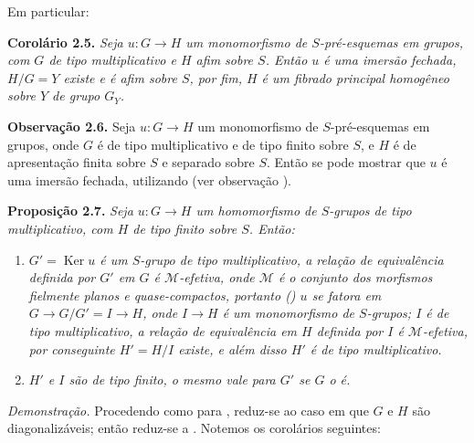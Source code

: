 Em particular:

\medskip
\noindent{}\textbf{Corolário 2.5.}
\textit{Seja \(u:G\to H\) um monomorfismo de \(S\)-pré-esquemas em grupos,
com \(G\) de tipo multiplicativo e \(H\) afim sobre \(S\). Então
\(u\) é uma imersão fechada, \(H/G=Y\) existe e é afim sobre \(S\),
por fim, \(H\) é um fibrado principal homogêneo sobre \(Y\) de
 grupo \(G_Y\).}

\medskip
\noindent{}\textbf{Observação 2.6.}
Seja \(u:G\to H\) um monomorfismo de \(S\)-pré-esquemas em grupos, onde
\(G\) é de tipo multiplicativo e de tipo finito sobre \(S\), e \(H\) é
de apresentação finita sobre \(S\) e separado sobre \(S\).
Então se pode mostrar que \(u\) é uma imersão fechada, utilizando
 (ver observação
).

\medskip
\noindent{}\textbf{Proposição 2.7.}
\textit{Seja \(u:G\to H\) um homomorfismo de \(S\)-grupos de tipo
multiplicativo, com \(H\) de tipo finito sobre \(S\). Então:}
\begin{enumerate}
  \item[(i)]
  \textit{\(G'=\operatorname{Ker}u\) é um \(S\)-grupo de tipo
  multiplicativo, a relação de equivalência definida por \(G'\) em
  \(G\) é \(\mathcal M\)-efetiva, onde \(\mathcal M\) é o
  conjunto dos morfismos fielmente planos e quase-compactos, portanto
  () \(u\) se fatora em
  \(G\to G/G'=I\to H\), onde \(I\to H\) é um monomorfismo de
  \(S\)-grupos; \(I\) é de tipo multiplicativo, a relação de
  equivalência em \(H\) definida por \(I\) é \(\mathcal M\)-efetiva,
  por conseguinte \(H'=H/I\) existe, e além disso \(H'\) é de tipo
  multiplicativo.}

  \item[(ii)]
  \textit{\(H'\) e \(I\) são de tipo finito, o mesmo vale para
  \(G'\) se \(G\) o é.}
\end{enumerate}

\emph{Demonstração.}
Procedendo como para , reduz-se
ao caso em que \(G\) e \(H\) são diagonalizáveis; então
 reduz-se a
.
Notemos os corolários seguintes:

